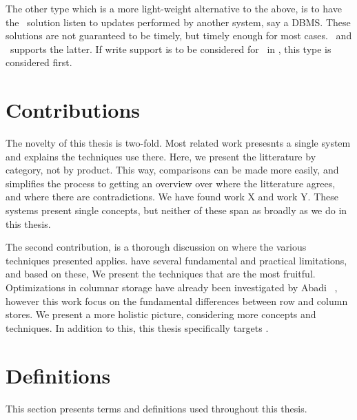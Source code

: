 The other type which is a more light-weight alternative to the above, is to have the \bd~solution listen to updates performed by another system, say a DBMS. These solutions are not guaranteed to be timely, but timely enough for most cases. \qlikview~and \tableau~supports the latter. If write support is to be considered for \bd~in \genusSoftware, this type is considered first.




\section{Contributions}
\label{sec:Contributions}
The novelty of this thesis is two-fold. Most related work presesnts a single system and explains the techniques use there. Here, we present the litterature by category, not by product. This way, comparisons can be made more easily, and simplifies the process to getting an overview over where the litterature agrees, and where there are contradictions. We have found work X and work Y. These systems present single concepts, but neither of these span as broadly as we do in this thesis.

The second contribution, is a thorough discussion on where the various techniques presented applies. \genusSoftware have several fundamental and practical limitations, and based on these, We present the techniques that are the most fruitful. Optimizations in columnar storage have already been investigated by Abadi \ea~\cite{Abadi2008-dd}, however this work focus on the fundamental differences between row and column stores. We present a more holistic picture, considering more concepts and techniques. In addition to this, this thesis specifically targets \genusSoftware.

\section{Definitions}
\label{sec:Definitions}
This section presents terms and definitions used throughout this thesis.

